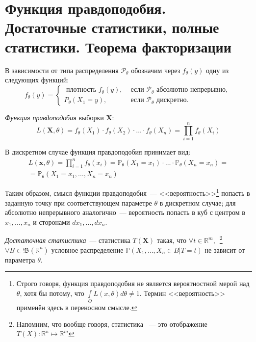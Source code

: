 \section{Функция правдоподобия. Достаточные статистики, полные статистики. Теорема факторизации}

В зависимости от типа распределения $\mathcal{P}_\theta$ обозначим через $f_{\theta}(y)$ одну из следующих функций:
\begin{equation*}
    f_{\theta}(y) =
    \left\{\begin{array}{ll}
    \text { плотность } f_{\theta}(y), & \text { если } \mathcal{P}_{\theta} \text { абсолютно непрерывно, } \\
    P_{\theta}\left(X_{1}=y\right), & \text { если } \mathcal{P}_{\theta} \text { дискретно. }
    \end{array}\right.
\end{equation*}

\begin{defn}
{\it Функция правдоподобия} выборки $\mathbf{X}$:
\begin{equation*}
    L(\mathbf{X} , \theta)=f_{\theta}\left(X_{1}\right) \cdot f_{\theta}\left(X_{2}\right) \cdot \ldots \cdot f_{\theta}\left(X_{n}\right)=\prod_{i=1}^{n} f_{\theta}\left(X_{i}\right)
\end{equation*}
\end{defn}

В дискретном случае функция правдоподобия принимает вид:
\begin{equation*}
\begin{aligned}
    L(\mathbf{x} , \theta)=\prod_{i=1}^{n} f_{\theta}(x_{i}) 
    = \mathbb{P}_{\theta}(X_{1}=x_{1}) \cdot \ldots \cdot \mathbb{P}_{\theta}(X_{n}=x_{n}) = \\
    = \mathbb{P}_{\theta}(X_{1}=x_{1}, \ldots, X_{n}=x_{n})
\end{aligned}
\end{equation*}

Таким образом, смысл функции правдоподобия~--- <<вероятность>>\footnote{Строго говоря, функция правдоподобия не является вероятностной мерой над $\theta$, хотя бы потому, что $\int\limits_{\Theta} L(x, \theta) d\theta \neq 1$. Термин <<вероятность>> применён здесь в переносном смысле.} попасть в заданную точку при соответствующем параметре $\theta$ в дискретном случае; для абсолютно непрерывного аналогично~--- вероятность попасть в куб с центром в $x_1, \ldots, x_n$ и сторонами $dx_1, \ldots, dx_n$.

\begin{defn}
{\it Достаточная статистика}~--- статистика $T(\mathbf{X})$ такая, что $\forall t \in \mathbb{R}^m,$~\footnote{Напомним, что вообще говоря, статистика ~--- это отображение $T(X): \mathbb{R}^n \mapsto \mathbb{R}^m$ } $ \forall B \in \mathfrak{B}(\mathbb{R}^{n})$ условное распределение $\mathbb{P}(X_1, \ldots, X_n \in B | T=t)$ не зависит от параметра $\theta$.
\end{defn}

